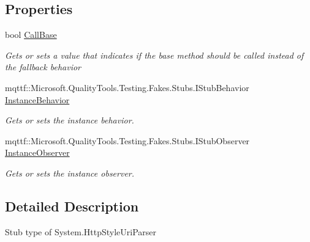 \subsection*{Properties}
\begin{DoxyCompactItemize}
\item 
bool \hyperlink{class_system_1_1_fakes_1_1_stub_http_style_uri_parser_a24a145543e9043e222e7a497476f4274}{Call\-Base}
\begin{DoxyCompactList}\small\item\em Gets or sets a value that indicates if the base method should be called instead of the fallback behavior\end{DoxyCompactList}\item 
mqttf\-::\-Microsoft.\-Quality\-Tools.\-Testing.\-Fakes.\-Stubs.\-I\-Stub\-Behavior \hyperlink{class_system_1_1_fakes_1_1_stub_http_style_uri_parser_aa4947c1336e854be44b501f4b5b7add3}{Instance\-Behavior}
\begin{DoxyCompactList}\small\item\em Gets or sets the instance behavior.\end{DoxyCompactList}\item 
mqttf\-::\-Microsoft.\-Quality\-Tools.\-Testing.\-Fakes.\-Stubs.\-I\-Stub\-Observer \hyperlink{class_system_1_1_fakes_1_1_stub_http_style_uri_parser_a93f4e2ca504266b466f8a6fe78fed0f6}{Instance\-Observer}
\begin{DoxyCompactList}\small\item\em Gets or sets the instance observer.\end{DoxyCompactList}\end{DoxyCompactItemize}


\subsection{Detailed Description}
Stub type of System.\-Http\-Style\-Uri\-Parser



